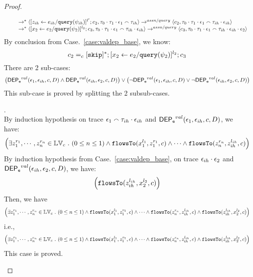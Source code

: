 \begin{proof}
\begin{case}[$\trace_2 = \trace_{ih} \cdot \event_{ih}$]
\begin{subcase}
\begin{equation}
\begin{array}{l}
  \qquad \rightarrow^{*} 
  \langle [\mathrel{ z_{ih} \leftarrow e_{ih} / {\tt query}(\psi_{ih}) }]^{l'};{c}_2, 
  \mathtt{\tau}_0 \cdot \mathtt{\tau}_1 \cdot \mathtt{\epsilon}_1 \smallfrown \mathtt{\tau}_{ih} \rangle 
  \rightarrow^{assn/query} 
  \langle {c}_2,  \mathtt{\tau}_0 \cdot \mathtt{\tau}_1 \cdot \mathtt{\epsilon}_1 \smallfrown \mathtt{\tau}_{ih} \cdot \mathtt{\epsilon}_{ih} \rangle  \\
  \qquad \rightarrow^{*} 
  \langle [\mathrel{ {x}_2 \leftarrow e_2 / {\tt query}(\psi_2) }]^{l_2};{c}_3, 
  \mathtt{\tau}_0 \cdot \mathtt{\tau}_1 \cdot \mathtt{\epsilon}_1  \smallfrown \mathtt{\tau}_{ih} \cdot \mathtt{\epsilon}_{ih} \rangle 
  \rightarrow^{assn/query} 
  \langle {c}_3,  \mathtt{\tau}_0 \cdot \mathtt{\tau}_1 \cdot \mathtt{\epsilon}_1  \smallfrown \mathtt{\tau}_{ih} \cdot \mathtt{\epsilon}_{ih} \cdot \mathtt{\epsilon}_2 \rangle 
\end{array}
 \end{equation}
By conclusion from Case.~\ref{case:valdep_base}, we know:
\[
 c_2 =_c [\mathtt{skip}]{}^*; [\mathrel{ {x}_2 \leftarrow e_2 / {\tt query}(\psi_2) }]^{l_2};{c}_3
 \]
 There are 2 sub-cases:
%
\[
\big(\mathsf{DEP_{\mathtt{e}}}^{val}(\mathtt{\epsilon}_1, \mathtt{\epsilon}_{ih}, c, D) \land 
\mathsf{DEP_{\mathtt{e}}}^{val}(\mathtt{\epsilon}_{ih}, \mathtt{\epsilon}_2, c, D)\big) \lor 
\big(\neg \mathsf{DEP_{\mathtt{e}}}^{val}(\mathtt{\epsilon}_1, \mathtt{\epsilon}_{ih}, c, D) 
\lor \neg \mathsf{DEP_{\mathtt{e}}}^{val}(\mathtt{\epsilon}_{ih}, \mathtt{\epsilon}_2, c, D)\big)
\]
%
This sub-case is proved by splitting the 2 subsub-cases.
%
\begin{subsubcase}
\label{case:valdep_ihasndep}.
\\
By induction hypothesis on trace $\mathtt{\epsilon}_1  \smallfrown \mathtt{\tau}_{ih} \cdot \mathtt{\epsilon}_{ih}$ and $\mathsf{DEP_{\mathtt{e}}}^{val}(\mathtt{\epsilon}_1, \mathtt{\epsilon}_{ih}, c,D)$, we have:
%
\[
\Big(\exists z_1^{r_1}, \cdots, z_n^{r_n} \in \mathbb{LV}_{{c}} ~.~ (0 \leq n \leq 1 )
 \land \mathtt{flowsTo}(x_1^{l_1}, z_1^{r_1}, c) \land \cdots \land \mathtt{flowsTo}(z_n^{r_n}, z_{ih}^{l_{ih}}, c) \Big)
\]
%
By induction hypothesis from Case.~\ref{case:valdep_base}, on trace $\mathtt{\epsilon}_{ih} \cdot \mathtt{\epsilon}_2$ and $\mathsf{DEP_{\mathtt{e}}}^{val}(\mathtt{\epsilon}_{ih}, \mathtt{\epsilon}_2, c, D)$, we have:
\[
\Big( \mathtt{flowsTo}(z_{ih}^{l_{ih}}, {x}_2^{l_2}, c) \Big)
\]
%
Then, we have
%
\[
\Big(\exists z_1^{r_1}, \cdots, z_n^{r_n} \in \mathbb{LV}_{{c}} ~.~ (0 \leq n \leq 1 )
 \land \mathtt{flowsTo}(x_1^{l_1}, z_1^{r_1}, c) \land \cdots \land \mathtt{flowsTo}(z_n^{r_n}, z_{ih}^{l_{ih}}, c)
 \land \mathtt{flowsTo}(z_{ih}^{l_{ih}}, {x}_2^{l_2}, c) \Big)
\]
%
i.e.,
\[
\Big(\exists z_1^{r_1}, \cdots, z_n^{r_n} \in \mathbb{LV}_{{c}} ~.~ (0 \leq n \leq 1 )
 \land \mathtt{flowsTo}(x_1^{l_1}, z_1^{r_1}, c) \land \cdots \land \mathtt{flowsTo}(z_n^{r_n}, z_{ih}^{l_{ih}}, c)
 \land \mathtt{flowsTo}(z_{ih}^{l_{ih}}, {x}_2^{l_2}, c) \Big)
\]
%
This case is proved.
\end{subsubcase}

\end{subcase}
\end{case}
\end{proof}

